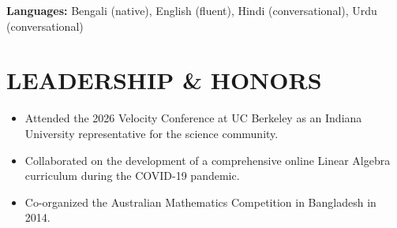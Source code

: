 \documentclass[10pt,letterpaper]{article}
\newenvironment{resumeItems}{%
  \begin{itemize}[
    label=\textbullet,
    leftmargin=14pt,
    labelsep=5pt,
    itemsep=0.5pt,
    topsep=1.0pt,
    parsep=0pt,
    partopsep=0pt
  ]
}{%
  \end{itemize}
}
\begin{document}
\textbf{Languages:}
Bengali (native), English (fluent), Hindi (conversational), Urdu (conversational)

\section*{LEADERSHIP \& HONORS}

\begin{resumeItems}
  \item Attended the 2026 Velocity Conference at UC Berkeley as an Indiana University representative for the science community.

  \item Collaborated on the development of a comprehensive online Linear Algebra curriculum during the COVID-19 pandemic.

  \item Co-organized the Australian Mathematics Competition in Bangladesh in 2014.
\end{resumeItems}
\end{document}
